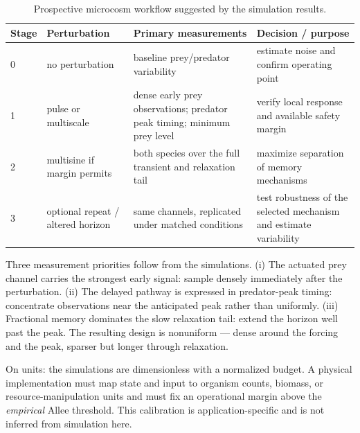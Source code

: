 \begin{table}[htbp]
\centering
\caption{Prospective microcosm workflow suggested by the simulation results.}
\label{tab:prospective-protocol}
\footnotesize
\setlength{\tabcolsep}{3pt}
\begin{tabular}{p{}p{}p{}p{}}
\hline
\textbf{Stage} & \textbf{Perturbation} & \textbf{Primary measurements} & \textbf{Decision / purpose}\\
\hline
0 & no perturbation & baseline prey/predator variability & estimate noise and confirm operating point\\
1 & pulse or multiscale & dense early prey observations; predator peak timing; minimum prey level & verify local response and available safety margin\\
2 & multisine if margin permits & both species over the full transient and relaxation tail & maximize separation of memory mechanisms\\
3 & optional repeat / altered horizon & same channels, replicated under matched conditions & test robustness of the selected mechanism and estimate variability\\
\hline
\end{tabular}
\end{table}

Three measurement priorities follow from the simulations. (i) The actuated prey channel carries the strongest early signal: sample densely immediately after the perturbation. (ii) The delayed pathway is expressed in predator-peak timing: concentrate observations near the anticipated peak rather than uniformly. (iii) Fractional memory dominates the slow relaxation tail: extend the horizon well past the peak. The resulting design is nonuniform --- dense around the forcing and the peak, sparser but longer through relaxation.

On units: the simulations are dimensionless with a normalized budget. A physical implementation must map state and input to organism counts, biomass, or resource-manipulation units and must fix an operational margin above the \emph{empirical} Allee threshold. This calibration is application-specific and is not inferred from simulation here.
